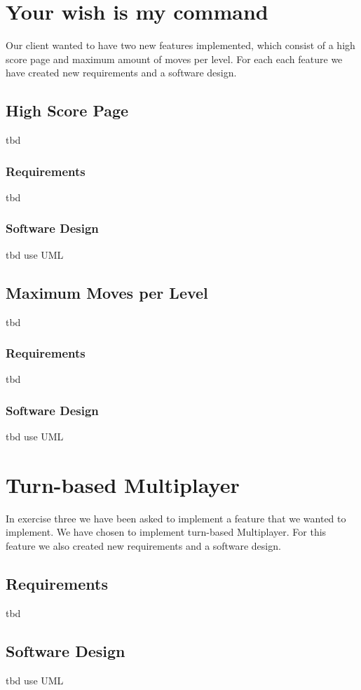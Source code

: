 \documentclass{article}
\begin{document}
\newpage
\section{Your wish is my command}
Our client wanted to have two new features implemented, which consist of a high score page and maximum amount of moves per level. For each each feature we have created new requirements and a software design.

\subsection{High Score Page}
tbd

\subsubsection{Requirements}
tbd

\subsubsection{Software Design}
tbd {use UML}

\subsection{Maximum Moves per Level}
tbd

\subsubsection{Requirements}
tbd

\subsubsection{Software Design}
tbd {use UML}


\section{Turn-based Multiplayer}
In exercise three we have been asked to implement a feature that we wanted to implement. We have chosen to implement turn-based Multiplayer. For this feature we also created new requirements and a software design.

\subsection{Requirements}
tbd

\subsection{Software Design}
tbd {use UML}
\end{document}
